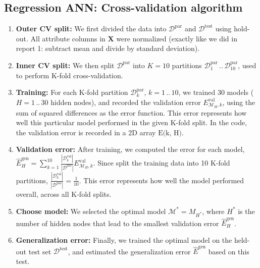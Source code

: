 \newpage
\subsection{Regression ANN: Cross-validation algorithm}\label{sec:ANN_reg_algorithm}


\begin{enumerate}
\item \textbf{Outer CV split:} We first divided the data into $\mathcal{D}^{\text{par}}$ and  $\mathcal{D}^{\text{test}}$ using hold-out. All attribute columns in $\bm{X}$ were normalized (exactly like we did in report 1: subtract mean and divide by standard deviation).

\item \textbf{Inner CV split:} We then split $\mathcal{D}^{\text{par}}$ into $K = 10$ partitions $\mathcal{D}_1^{\text{par}} \, .. \, \mathcal{D}_{10}^{\text{par}}$, used to perform K-fold cross-validation.

\item \textbf{Training:} For each K-fold partition $\mathcal{D}_k^{\text{par}}$, $k = 1 \, .. \, 10$, we trained 30 models ($H = 1 \, .. \, 30$ hidden nodes), and recorded the validation error $E_{\mathcal{M}_H, k}^{\text{val}}$, using the  sum of squared differences as the error function. This error represents how well this particular model performed in the given K-fold split. In the code, the validation error is recorded in a 2D array $\text{E(k, H)}$.

\item \textbf{Validation error:} After training, we computed the error for each model, $\hat{E}_H^{\text{gen}} = \sum_{k=1}^{10} \frac{ | \mathcal{D}_k^{\text{val}}  | }{ | \mathcal{D}^{ \text{par} } | } E_{\mathcal{M}_H, k}^{\text{val}}$. Since split the training data into 10 K-fold partitions, $\frac{ | \mathcal{D}_k^{\text{val}}  | }{ | \mathcal{D}^{ \text{par} } | } = \frac{1}{10}$. This error represents how well the model performed overall, across all K-fold splits.

\item \textbf{Choose model:} We selected the optimal model $\mathcal{M}^{*} = M_{H^{*}}$, where $H^*$ is the number of hidden nodes that lead to the smallest validation error $\hat{E}_H^{\text{gen}}$.

\item \textbf{Generalization error:} Finally, we trained the optimal model on the held-out test set $\mathcal{D}^{\text{test}}$, and estimated the generalization error $\hat{E}^{\text{gen}}$ based on this test.
\end{enumerate}

